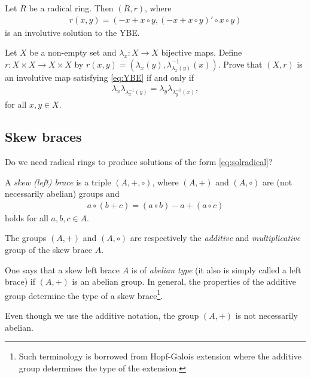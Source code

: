     \begin{proposition}
        Let $R$ be a radical ring. Then $(R,r)$, where 
        \begin{align}\label{eq:solradical}
            r(x, y) = (-x + x\circ y, (-x + x \circ y)'\circ x\circ y)
        \end{align}
        is an involutive solution to the YBE.
    \end{proposition}

    \begin{exercise}\label{ex:involutive}
        Let $X$ be a non-empty set and $\lambda_x:X \to X$ bijective maps. Define $r:X\times X \to X \times X$ by $r(x,y)=(\lambda_x(y),\lambda^{-1}_{\lambda_x(y)}(x))$. Prove that $(X,r)$ is an involutive map satisfying \eqref{eq:YBE} if and only if 
        \begin{align*}
            \lambda_x\lambda_{\lambda^{-1}_x(y)} =\lambda_y\lambda_{\lambda^{-1}_y(x)},
        \end{align*}
        for all $x,y\in X$.
    \end{exercise}


    \subsection{Skew braces}
    Do we need radical rings to produce solutions of the form \eqref{eq:solradical}?

    \begin{definition}
         A \emph{skew (left) brace} is a triple $(A,+,\circ)$, where 
        $(A,+)$ and $(A,\circ)$ 
    	are (not necessarily abelian) 
    	groups and 
    	\begin{align}\label{compatibility}
    	    a\circ(b+c)=(a\circ b)-a+(a\circ c)
    	\end{align}
    	holds for all $a,b,c\in A$. 
    
    The groups $(A,+)$ and $(A,\circ)$ are respectively the \emph{additive} and \emph{multiplicative} group	of the skew brace $A$.
    \end{definition}

    One says that a skew left brace $A$ is of \emph{abelian type} (it also is simply called a left brace) if $(A,+)$ is an abelian group. 
    In general, the properties of the additive group determine the type of a skew brace\footnote{Such terminology is borrowed from Hopf-Galois extension where the additive group determines the type of the extension.}.
    
    \begin{remark}
        Even though we use the additive notation, the group $(A,+)$ is not necessarily abelian.
    \end{remark}

